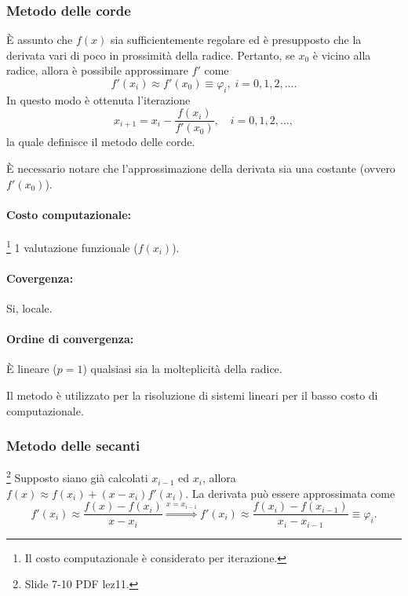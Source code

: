 \subsubsection{Metodo delle corde}\label{sssec:metodo_corde}
È assunto che $f(x)$ sia sufficientemente regolare ed è presupposto che la derivata vari di poco in prossimità della radice.
Pertanto, se $x_0$ è vicino alla radice, allora è possibile approssimare $f'$ come
\begin{equation*}
	f'(x_i)\approx f'(x_0)\equiv\varphi_i,\; i=0,1,2,\hdots.
\end{equation*}
In questo modo è ottenuta l'iterazione 
\begin{equation}\label{eq:approxCorde}
	x_{i+1}=x_i-\frac{f(x_i)}{f'(x_0)}, \quad i=0,1,2,\hdots,
\end{equation}
la quale definisce il metodo delle corde.

È necessario notare che l'approssimazione della derivata sia una costante (ovvero $f'(x_0)$).

\paragraph{Costo computazionale:}\footnote{Il costo computazionale è considerato per iterazione.} 1 valutazione funzionale ($f(x_i)$).
\paragraph{Covergenza:}Si, locale.
\paragraph{Ordine di convergenza:} È lineare ($p = 1$) qualsiasi sia la molteplicità della radice.

Il metodo è utilizzato per la risoluzione di sistemi lineari per il basso costo di computazionale.

\subsubsection{Metodo delle secanti}\label{sssec:metodo_secanti}
\footnote{Slide 7-10 PDF lez11.}
Supposto siano già calcolati $x_{i-1}$ ed $x_i$, allora $f(x)\approx f(x_i)+(x-x_i)f'(x_i)$. La derivata può essere approssimata come 
\begin{equation*}
	f'(x_i)\approx\frac{f(x)-f(x_{i})}{x-x_i}\overset{x=x_{i-1}}{\Longrightarrow}f'(x_i)\approx\frac{f(x_i)-f(x_{i-1})}{x_i-x_{i-1}}\equiv\varphi_i.
\end{equation*}

